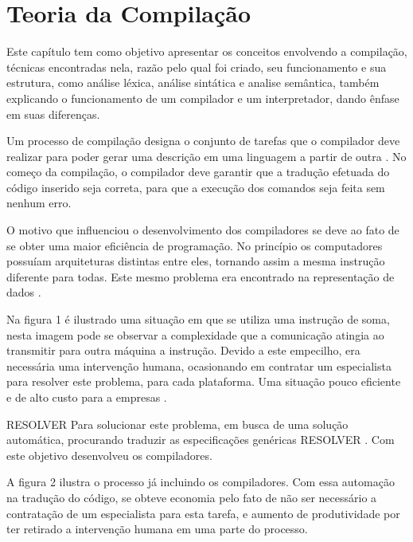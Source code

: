 \documentclass[12pt,oneside,a4paper,chapter=TITLE,section=TITLE,sumario=tradicional]{abntex2}
\begin{document}
\chapter{Teoria da Compilação}
\label{cap:teoria-da-compilação}

Este capítulo tem como objetivo apresentar os conceitos envolvendo a compilação, técnicas encontradas nela, razão pelo qual foi criado, seu funcionamento e sua estrutura, como análise léxica, análise sintática e analise semântica, também explicando o funcionamento de um compilador e um interpretador, dando ênfase em suas diferenças.

Um processo de compilação designa o conjunto de tarefas que o compilador deve realizar para poder gerar uma descrição em uma linguagem a partir de outra \cite{pedro2018}. No começo da compilação, o compilador deve garantir que a tradução efetuada do código inserido seja correta, para que a execução dos comandos seja feita sem nenhum erro.

O motivo que influenciou o desenvolvimento dos compiladores se deve ao fato de se obter uma maior eficiência de programação. No princípio os computadores possuíam arquiteturas distintas entre eles, tornando assim a mesma instrução diferente para todas. Este mesmo problema era encontrado na representação de dados \cite{ricarte2008}.

Na figura 1 é ilustrado uma situação em que se utiliza uma instrução de soma, nesta imagem pode se observar a complexidade que a comunicação atingia ao transmitir para outra máquina a instrução. Devido a este empecilho, era necessária uma intervenção humana, ocasionando em contratar um especialista para resolver este problema, para cada plataforma. Uma situação pouco eficiente e de alto custo para a empresas  \cite{ricarte2008}.

\begin{figure}[htb]
\end{figure}
RESOLVER
Para solucionar este problema, em busca de uma solução automática, procurando traduzir as especificações genéricas  RESOLVER \cite{ricarte2008}. Com este objetivo desenvolveu os compiladores.

A figura 2 ilustra o processo já incluindo os compiladores. Com essa automação na tradução do código, se obteve economia pelo fato de não ser necessário a contratação de um especialista para esta tarefa, e aumento de produtividade por ter retirado a intervenção humana em uma parte do processo. 
\end{document}
